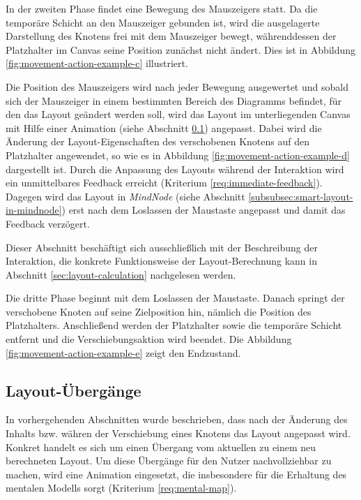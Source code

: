 In der zweiten Phase findet eine Bewegung des Mauszeigers statt. Da die temporäre Schicht an den Mauszeiger gebunden ist, wird die ausgelagerte Darstellung des Knotens frei mit dem Mauszeiger bewegt, währenddessen der Platzhalter im Canvas seine Position zunächst nicht ändert. Dies ist in Abbildung \ref{fig:movement-action-example-c} illustriert.

Die Position des Mauszeigers wird nach jeder Bewegung ausgewertet und sobald sich der Mauszeiger in einem bestimmten Bereich des Diagramms befindet, für den das Layout geändert werden soll, wird das Layout im unterliegenden Canvas mit Hilfe einer Animation (siehe Abschnitt \ref{subsec:layout-transitions}) angepasst. Dabei wird die Änderung der Layout-Eigenschaften des verschobenen Knotens auf den Platzhalter angewendet, so wie es in Abbildung \ref{fig:movement-action-example-d} dargestellt ist. Durch die Anpassung des Layouts während der Interaktion wird ein unmittelbares Feedback erreicht (Kriterium \ref{req:immediate-feedback}). Dagegen wird das Layout in \textit{MindNode} (siehe Abschnitt \ref{subsubsec:smart-layout-in-mindnode}) erst nach dem Loslassen der Maustaste angepasst und damit das Feedback verzögert.

Dieser Abschnitt beschäftigt sich ausschließlich mit der Beschreibung der Interaktion, die konkrete Funktionsweise der Layout-Berechnung kann in Abschnitt \ref{sec:layout-calculation} nachgelesen werden.

Die dritte Phase beginnt mit dem Loslassen der Maustaste. Danach springt der verschobene Knoten auf seine Zielposition hin, nämlich die Position des Platzhalters. Anschließend werden der Platzhalter sowie die temporäre Schicht entfernt und die Verschiebungsaktion wird beendet. Die Abbildung \ref{fig:movement-action-example-e} zeigt den Endzustand.

\subsection{Layout-Übergänge}
\label{subsec:layout-transitions}

In vorhergehenden Abschnitten wurde beschrieben, dass nach der Änderung des Inhalts bzw. währen der Verschiebung eines Knotens das Layout angepasst wird. Konkret handelt es sich um einen Übergang vom aktuellen zu einem neu berechneten Layout. Um diese Übergänge für den Nutzer nachvollziehbar zu machen, wird eine Animation eingesetzt, die insbesondere für die Erhaltung des mentalen Modells sorgt (Kriterium \ref{req:mental-map}).

